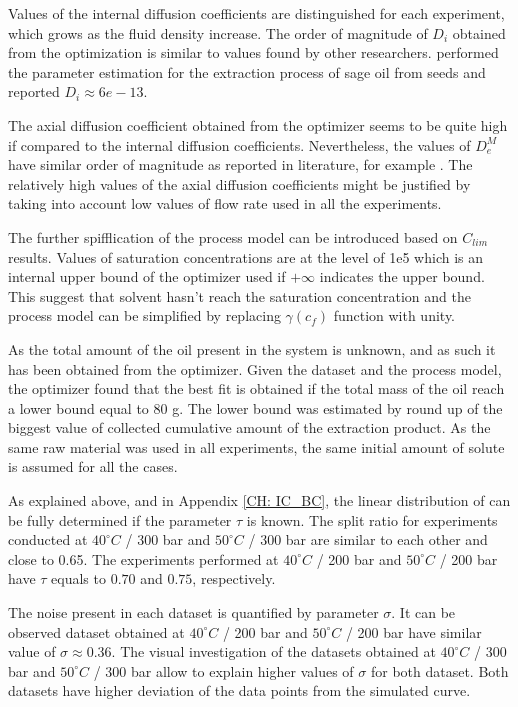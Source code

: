 \documentclass[../Article_Model_Parameters.tex]{subfiles}
\begin{document}
	Values of the internal diffusion coefficients are distinguished for each experiment, which grows as the fluid density increase. The order of magnitude of $D_i$ obtained from the optimization is similar to values found by other researchers. \citet{Reverchon1996} performed the parameter estimation for the extraction process of sage oil from seeds and reported $D_i \approx 6e-13$.
	
	The axial diffusion coefficient obtained from the optimizer seems to be quite high if compared to the internal diffusion coefficients. Nevertheless, the values of $D_e^M$ have similar order of magnitude as reported in literature, for example \citet{ReisVasco2000}. The relatively high values of the axial diffusion coefficients might be justified by taking into account low values of flow rate used in all the experiments.
	
	The further spifflication of the process model can be introduced based on $C_{lim}$ results. Values of saturation concentrations are at the level of 1e5 which is an internal upper bound of the optimizer used if $+\infty$ indicates the upper bound. This suggest that solvent hasn't reach the saturation concentration and the process model can be simplified by replacing $\gamma(c_f)$ function with unity.
	
	As the total amount of the oil present in the system is unknown, and as such it has been obtained from the optimizer. Given the dataset and the process model, the optimizer found that the best fit is obtained if the total mass of the oil reach a lower bound equal to 80 g. The lower bound was estimated by round up of the biggest value of collected cumulative amount of the extraction product. As the same raw material was used in all experiments, the same initial amount of solute is assumed for all the cases.
	
	As explained above, and in Appendix \ref{CH: IC_BC}, the linear distribution of can be fully determined if the parameter $\tau$ is known. The split ratio for experiments conducted at $40 ^\circ C$ / 300 bar and $50 ^\circ C$ / 300 bar are similar to each other and close to 0.65. The experiments performed at $40 ^\circ C$ / 200 bar and $50 ^\circ C$ / 200 bar have $\tau$ equals to $0.70$ and $0.75$, respectively. 
	
	The noise present in each dataset is quantified by parameter $\sigma$. It can be observed dataset obtained at $40 ^\circ C$ / 200 bar and $50 ^\circ C$ / 200 bar have similar value of $\sigma\approx0.36$. The visual investigation of the datasets obtained at $40 ^\circ C$ / 300 bar and $50 ^\circ C$ / 300 bar allow to explain higher values of $\sigma$ for both dataset. Both datasets have higher deviation of the data points from the simulated curve.
	
\end{document}
